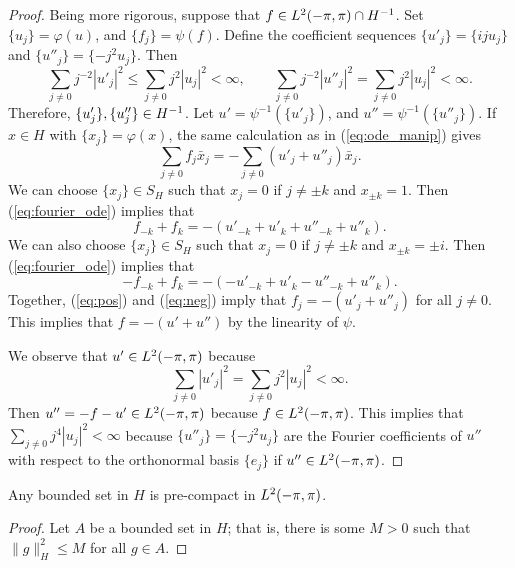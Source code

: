 \documentclass{homework}
\begin{document}
\begin{arabicparts}
\begin{proof}
			Being more rigorous, suppose that $f \in {L^2(-\pi,\pi)}\cap {H^{-1}}$. Set $\{u_j\} = \varphi(u)$, and $\{f_j\} = \psi(f)$. Define the coefficient sequences $\{u'_j\} = \{iju_j\}$ and $\{u''_j\} = \{-j^2u_j\}$. Then
			\begin{equation}
				\sum_{j\ne0}j^{-2}|u'_j|^2 \le \sum_{j\ne0} j^2|u_j|^2 < \infty,\qquad\sum_{j\ne0}j^{-2}|u''_j|^2 = \sum_{j\ne0}j^2|u_j|^2 <\infty.
			\end{equation}
			Therefore, $\{u'_j\}, \{u''_j\}\in{H^{-1}}$. Let $u' = \psi^{-1}(\{u'_j\})$, and $u'' = \psi^{-1}(\{u''_j\})$. If $x \in H$ with $\{x_j\} =\varphi(x)$, the same calculation as in (\ref{eq:ode_manip}) gives
			\begin{equation}
				\label{eq:fourier_ode}
				\sum_{j\ne0}f_j\bar{x}_j = -\sum_{j\ne0}(u'_j+u''_j)\bar{x}_j.
			\end{equation}
			We can choose $\{x_j\} \in S_H$ such that $x_j = 0$ if $j \ne \pm k$ and $x_{\pm k} = 1$. Then (\ref{eq:fourier_ode}) implies that
			\begin{equation}
				\label{eq:pos}
				f_{-k} + f_k = -(u'_{-k} + u'_k + u''_{-k}+u''_k).
			\end{equation}
			We can also choose $\{x_j\} \in S_H$ such that $x_j = 0$ if $j\ne \pm k$ and $x_{\pm k} = \pm i$. Then (\ref{eq:fourier_ode}) implies that
			\begin{equation}
				\label{eq:neg}
				-f_{-k} + f_k = -(-u'_{-k} + u'_k -u''_{-k} + u''_k).
			\end{equation}
			Together, (\ref{eq:pos}) and (\ref{eq:neg}) imply that $f_j = -(u'_j + u''_j)$ for all $j\ne0$. This implies that $f = -(u' + u'')$ by the linearity of $\psi$.
			
			We observe that $u' \in {L^2(-\pi,\pi)}$ because
			\begin{equation}
				\sum_{j\ne0}|u'_j|^2 = \sum_{j\ne0}j^2|u_j|^2 <\infty.
			\end{equation}
			Then $u'' = -f-u' \in {L^2(-\pi,\pi)}$ because $f\in{L^2(-\pi,\pi)}$. This implies that $\sum\limits_{j\ne 0}j^4|u_j|^2 < \infty$ because $\{u''_j\} = \{-j^2u_j\}$ are the Fourier coefficients of $u''$ with respect to the orthonormal basis $\{e_j\}$ if $u'' \in {L^2(-\pi,\pi)}$.
		\end{proof}
		
		\questionpart
		Any bounded set in $H$ is pre-compact in ${L^2(-\pi,\pi)}$.
		
		\begin{proof}
			Let $A$ be a bounded set in $H$; that is, there is some $M > 0$ such that $\lVert g \rVert_H^2\le M$ for all $g \in A$.
			

\end{proof}
\end{arabicparts}
\end{document}
